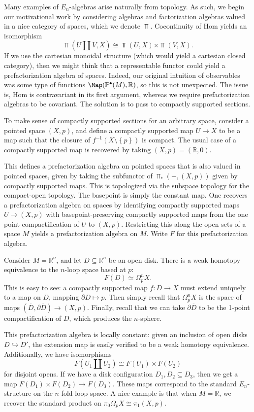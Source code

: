 Many examples of $E_n$-algebras arise naturally from topology. As such, we begin our motivational work by considering algebras and factorization algebras valued in a nice category of spaces, which we denote $\Top $. Cocontinuity of Hom yields an isomorphism
\[
	\Top (U \amalg V, X) \cong \Top (U,X)\times \Top (V,X)
.\]
If we use the cartesian monoidal structure (which would yield a cartesian closed category), then we might think that a representable functor could yield a prefactorization algebra of spaces. Indeed, our original intuition of observables was some type of functions $\Map(\mathbb{P}^{\bullet} (M), \mathbb{R} ) $, so this is not unexpected. The issue is, Hom is contravariant in its first argument, whereas we require prefactorization algebras to be covariant. The solution is to pass to compactly supported sections.

To make sense of compactly supported sections for an arbitrary space, consider a pointed space $(X,p)$, and define a compactly supported map $U\to X$ to be a map such that the closure of $f^{-1} (X\setminus \left\{ p \right\} )$ is compact. The usual case of a compactly supported map is recovered by taking $(X,p)=(\mathbb{R} ,0)$.

This defines a prefactorization algebra on pointed spaces that is also valued in pointed spaces, given by taking the subfunctor of $\Top _*(-,(X,p))$ given by compactly supported maps. This is topologized via the subspace topology for the compact-open topology. The basepoint is simply the constant map. One recovers a prefactorization algebra on spaces by identifying compactly supported maps $U\to (X,p)$ with basepoint-preserving compactly supported maps from the one point compactification of $U$ to $(X,p)$. Restricting this along the open sets of a space $M$ yields a prefactorization algebra on $M$. Write $F$ for this prefactorization algebra.

Consider $M=\mathbb{R} ^n$, and let $D\subseteq \mathbb{R} ^n$ be an open disk. There is a weak homotopy equivalence to the $n$-loop space based at $p$:
\[
	F(D)\simeq \Omega^n_pX
.\]
This is easy to see: a compactly supported map $f : D \to X$ must extend uniquely to a map on $\overline{D} $, mapping $\partial \overline{D} \mapsto p$. Then simply recall that $\Omega ^n_pX$ is the space of maps $(\overline{D}, \partial \overline{D} ) \to (X,p)$. Finally, recall that we can take $\partial \overline{D} $ to be the 1-point compactification of $D$, which produces the $n$-sphere.

This prefactorization algebra is locally constant: given an inclusion of open disks $D\hookrightarrow D'$, the extension map is easily verified to be a weak homotopy equivalence. Additionally, we have isomorphisms
\[
	F(U_1 \amalg U_2)\cong F(U_1)\times F(U_2)
\]
for disjoint opens. If we have a disk configuration $D_1,D_2 \subseteq D_3$, then we get a map $F(D_1)\times F(D_2)\to F(D_3)$. These maps correspond to the standard $E_n$-structure on the $n$-fold loop space. A nice example is that when $M=\mathbb{R} $, we recover the standard product on $\pi _0\Omega _pX \cong \pi _1(X,p)$.

